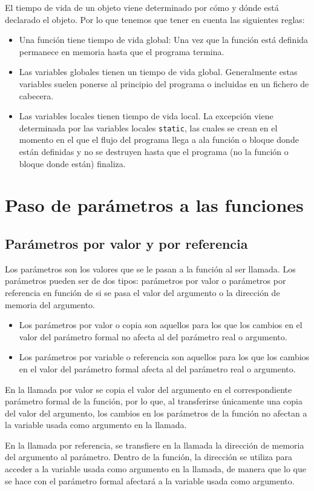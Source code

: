 El tiempo de vida de un objeto viene determinado por cómo y dónde está declarado el objeto. Por lo que tenemos que tener en cuenta las siguientes reglas:
\begin{itemize}
	\item Una función tiene tiempo de vida global: Una vez que la función está definida permanece en memoria hasta que el programa termina.
	\item Las variables globales tienen un tiempo de vida global. Generalmente estas variables suelen ponerse al principio del programa o incluidas en un fichero de cabecera.
	\item Las variables locales tienen tiempo de vida local. La excepción viene determinada por las variables locales \texttt{static}, las cuales se crean en el momento en el que el flujo del programa llega a ala función o bloque donde están definidas y no se destruyen hasta que el programa (no la función o bloque donde están) finaliza.
\end{itemize}
\section{Paso de parámetros a las funciones}
\subsection{Parámetros por valor y por referencia}{
Los parámetros son los valores que se le pasan a la función al ser llamada. Los parámetros pueden ser de dos tipos: parámetros por valor o parámetros por referencia en función de si se pasa el valor del argumento o la dirección de memoria del argumento.
\begin{itemize}
	\item Los parámetros por valor o copia son aquellos para los que los cambios en el valor del parámetro formal no afecta al del parámetro real o argumento.
	\item Los parámetros por variable o referencia son aquellos para los que los cambios en el valor del parámetro formal afecta al del parámetro real o argumento.
\end{itemize}
En la llamada por valor se copia el valor del argumento en el correspondiente parámetro formal de la función, por lo que, al transferirse únicamente una copia del valor del argumento, los cambios en los parámetros de la función no afectan a la variable usada como argumento en la llamada.

En la llamada por referencia, se transfiere en la llamada la dirección de memoria del argumento al parámetro. Dentro de la función, la dirección se utiliza para acceder a la variable usada como argumento en la llamada, de manera que lo que se hace con el parámetro formal afectará a la variable usada como argumento.
}

